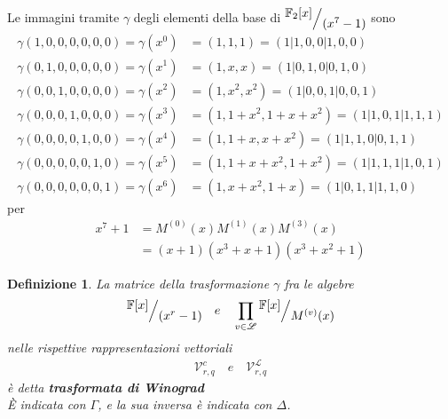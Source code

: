 \documentclass[mathserif]{beamer}
\def\quotient#1#2{%
   \raise1ex\hbox{$#1$}\Big/\lower1ex\hbox{$#2$}%
}
\newtheorem{definizione}{Definizione}
\begin{document}
\thispagestyle{empty}
\begin{frame}
   \vspace{-1.2cm}
    Le immagini tramite $\gamma$ degli elementi della base di $ \quotient{\mathbb{F}_{2} \lbrack x \rbrack  }{ (x^{7} - 1)}$ sono
    \begin{align*}   
	\gamma(1,0,0,0,0,0,0)  = \gamma(x^0) &= (1,1,1) =  (1|1,0,0|1,0,0)          \\
	\gamma(0,1,0,0,0,0,0)  = \gamma(x^1) &= (1,x,x) = (1|0,1,0|0,1,0)            \\
	\gamma(0,0,1,0,0,0,0)  = \gamma(x^2) &= (1,x^2,x^2) = (1|0,0,1|0,0,1)        \\
	\gamma(0,0,0,1,0,0,0)  = \gamma(x^3) &= (1,1+x^2,1+x+x^2) = (1|1,0,1|1,1,1)  \\
	\gamma(0,0,0,0,1,0,0)  = \gamma(x^4) &= (1,1+x,x+x^2) = (1|1,1,0|0,1,1)      \\
	\gamma(0,0,0,0,0,1,0)  = \gamma(x^5) &= (1,1+x+x^2,1+x^2) = (1|1,1,1|1,0,1)  \\
	\gamma(0,0,0,0,0,0,1)  = \gamma(x^6) &= (1,x+x^2,1+x) = (1|0,1,1|1,1,0) 
    \end{align*}
    per 
    \begin{align*}
      x^{7} + 1 &= M^{(0)}(x) M^{(1)}(x) M^{(3)}(x) \\
		&= (x+1)(x^3 + x + 1)(x^3 + x^2 + 1) 
    \end{align*}
\end{frame}


\begin{frame}
    \begin{definizione}
      La matrice della trasformazione $\gamma$ fra le algebre
      \begin{align*}
         \quotient{\mathbb{F} \lbrack x \rbrack  }{ (x^{r} - 1)} 
         \quad 
         e 
         \quad 
         \prod_{v\in \mathscr{L}} \quotient{\mathbb{F} \lbrack x \rbrack  }{M^{(v)}(x)}
      \end{align*}
      nelle rispettive rappresentazioni vettoriali 
      \begin{align*}
         \mathcal{V}_{r, q}^{c} \quad e \quad \mathcal{V}_{r,q}^{\mathscr{L}}
      \end{align*}      
      è detta {\bf trasformata di Winograd} \\
      È indicata con $\Gamma$, e la sua inversa è indicata con $\Delta$.
    \end{definizione}
\end{frame}
\end{document}
